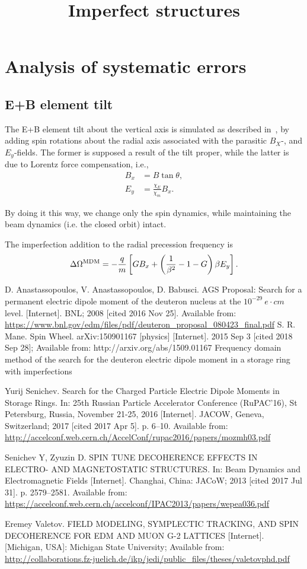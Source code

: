 \documentclass{article}
\newcommand{\MDM}{{}^\mathrm{MDM}}
\begin{document}
\title{Imperfect structures}
\section{Analysis of systematic errors}
\subsection{E+B element tilt}
The E+B element tilt about the vertical axis is simulated as described in~\cite{Valetov:Thesis}, by adding spin rotations about the radial axis associated with the parasitic $B_X$-, and $E_y$-fields. The former is supposed a result of the tilt proper, while the latter is due to Lorentz force compensation, i.e.,
\begin{align}
  B_x &= B\tan\theta, \\
  E_y &= \frac{\chi_E}{\chi_m} B_x.
\end{align}

By doing it this way, we change only the spin dynamics, while maintaining the beam dynamics (i.e. the closed orbit) intact. 

The imperfection addition to the radial precession frequency is
\[
\Delta\Omega\MDM = -\frac{q}{m}\bkt*{G B_x + \bkt{\frac{1}{\beta^2} - 1 - G}\beta E_y}.
\]


\begin{thebibliography}{99}
  D. Anastassopoulos, V. Anastassopoulos, D. Babusci. AGS Proposal: Search for a permanent electric dipole moment of the deuteron nucleus at the $10^{−29} ~ e\cdot cm$ level. [Internet]. BNL; 2008 [cited 2016 Nov 25]. Available from: \url{https://www.bnl.gov/edm/files/pdf/deuteron_proposal_080423_final.pdf}
  S. R. Mane. Spin Wheel. arXiv:150901167 [physics] [Internet]. 2015 Sep 3 [cited 2018 Sep 28]; Available from: http://arxiv.org/abs/1509.01167
  Frequency domain method of the search for the deuteron electric dipole moment in a storage ring with imperfections

  Yurij Senichev. Search for the Charged Particle Electric Dipole Moments in Storage Rings. In: 25th Russian Particle Accelerator Conference (RuPAC’16), St Petersburg, Russia, November 21-25, 2016 [Internet]. JACOW, Geneva, Switzerland; 2017 [cited 2017 Apr 5]. p. 6–10. Available from: \url{http://accelconf.web.cern.ch/AccelConf/rupac2016/papers/mozmh03.pdf}

  Senichev Y, Zyuzin D. SPIN TUNE DECOHERENCE EFFECTS IN ELECTRO- AND  MAGNETOSTATIC STRUCTURES. In: Beam Dynamics and Electromagnetic Fields [Internet]. Changhai, China: JACoW; 2013 [cited 2017 Jul 31]. p. 2579--2581. Available from: \url{https://accelconf.web.cern.ch/accelconf/IPAC2013/papers/wepea036.pdf}

  Eremey Valetov. FIELD MODELING, SYMPLECTIC TRACKING, AND SPIN DECOHERENCE FOR EDM AND MUON G-2 LATTICES [Internet]. [Michigan, USA]: Michigan State University; Available from: \url{http://collaborations.fz-juelich.de/ikp/jedi/public_files/theses/valetovphd.pdf}


\end{thebibliography}
\end{document}
